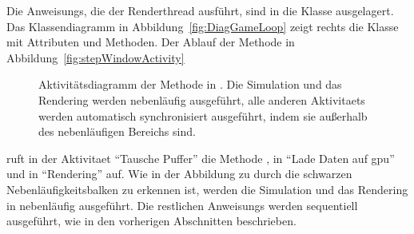 Die \glspl{Anweisung}, die der Renderthread ausführt, sind in die Klasse  ausgelagert. Das Klassendiagramm in Abbildung~\vref{fig:DiagGameLoop} zeigt rechts die Klasse  mit Attributen und Methoden. Der Ablauf der Methode  in Abbildung~\vref{fig:stepWindowActivity}
\begin{figure}
	\centering
	
	\caption[Aktivitätsdiagramm der Methode  in .]{Aktivitätsdiagramm der Methode  in . Die Simulation und das Rendering werden nebenläufig ausgeführt, alle anderen \glspl{Aktivitaet} werden automatisch synchronisiert ausgeführt, indem sie außerhalb des nebenläufigen Bereichs sind.}\label{fig:stepWindowActivity}
\end{figure}
ruft  in der \gls{Aktivitaet} \enquote{Tausche Puffer} die Methode , in \enquote{Lade Daten auf \ac{gpu}}  und in \enquote{Rendering}  auf. Wie in der Abbildung zu durch die schwarzen Nebenläufigkeitsbalken zu erkennen ist, werden die Simulation und das Rendering in  nebenläufig ausgeführt. Die restlichen \glspl{Anweisung} werden sequentiell ausgeführt, wie in den vorherigen Abschnitten beschrieben.